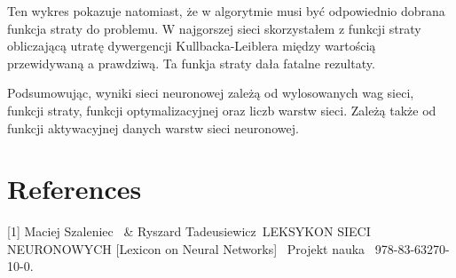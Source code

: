 \documentclass{article}
\begin{document}
Ten wykres pokazuje natomiast, że w algorytmie musi być odpowiednio dobrana funkcja straty do problemu.
W najgorszej sieci skorzystałem z funkcji straty obliczającą utratę 
dywergencji Kullbacka-Leiblera między wartością przewidywaną a prawdziwą.
Ta funkja straty dała fatalne rezultaty.

Podsumowując, wyniki sieci neuronowej zależą od wylosowanych wag sieci, funkcji straty, funkcji optymalizacyjnej oraz liczb warstw sieci.
Zależą także od funkcji aktywacyjnej danych warstw sieci neuronowej.

\section*{References}

\small

[1] Maciej Szaleniec \ \& Ryszard Tadeusiewicz\ LEKSYKON SIECI NEURONOWYCH 
[Lexicon on Neural Networks] \ Projekt nauka \ 978-83-63270-10-0.
\end{document}
